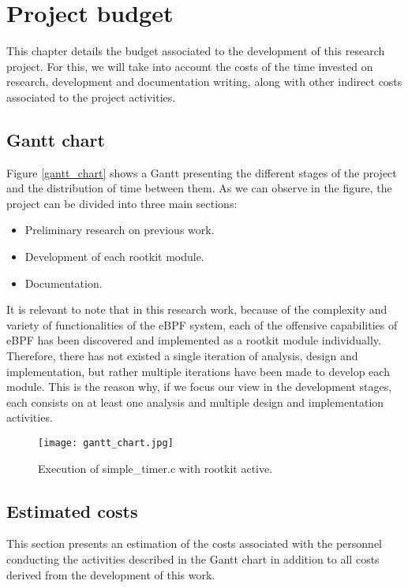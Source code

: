 \chapter{Project budget}
This chapter details the budget associated to the development of this research project. For this, we will take into account the costs of the time invested on research, development and documentation writing, along with other indirect costs associated to the project activities.

\section{Gantt chart}
Figure \ref{gantt_chart} shows a Gantt presenting the different stages of the project and the distribution of time between them. As we can observe in the figure, the project can be divided into three main sections:
\begin{itemize}
\item Preliminary research on previous work.
\item Development of each rootkit module.
\item Documentation.
\end{itemize}

It is relevant to note that in this research work, because of the complexity and variety of functionalities of the eBPF system, each of the offensive capabilities of eBPF has been discovered and implemented as a rootkit module individually. Therefore, there has not existed a single iteration of analysis, design and implementation, but rather multiple iterations have been made to develop each module. This is the reason why, if we focus our view in the development stages, each consists on at least one analysis and multiple design and implementation activities.


\begin{figure}[htbp]
	\centering
	\texttt{[image: gantt\_chart.jpg]}
	\caption{Execution of simple\_timer.c with rootkit active.}
	\label{fig:gannt_chart}
\end{figure}

\section{Estimated costs}
This section presents an estimation of the costs associated with the  personnel conducting the activities described in the Gantt chart in addition to all costs derived from the development of this work.

